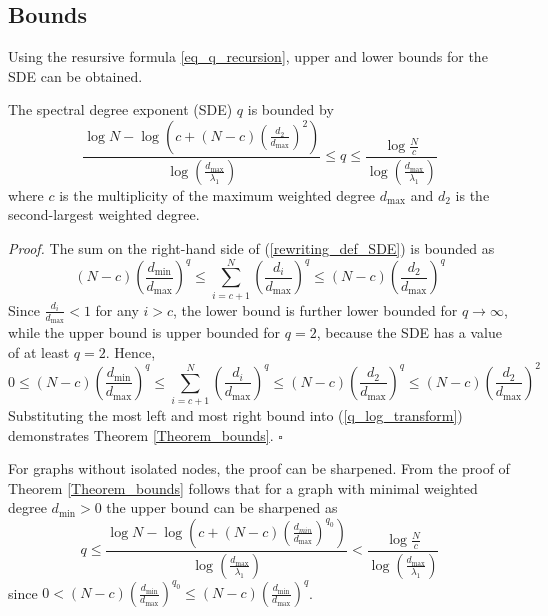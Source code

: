 \documentclass{comnet}%
\begin{document}
\subsection{Bounds}\label{sec_bounds}
Using the resursive formula \eqref{eq_q_recursion}, upper and lower bounds for the SDE can be obtained.
\begin{theorem}\label{Theorem_bounds}
	The spectral degree exponent (SDE) $q$ is bounded by
	\begin{equation}\label{eq_q_upper_bound2}
		\frac{\log N - \log\left( c + ( N-c) \left( \frac{d_{2}}{d_{\max}}\right)  ^{2} \right) }{\log\left( \frac{d_{\max}}{\lambda_{1}}\right)} \leq q \leq \frac{\log \frac{N}{c}}{\log\left( \frac{d_{\max}}{\lambda_{1}}\right) }
	\end{equation}
	where $c$ is the multiplicity of the maximum weighted degree $d_{\max}$ and $d_2$ is the second-largest weighted degree.
\end{theorem}
\textit{Proof.} The sum on the right-hand side of (\ref{rewriting_def_SDE}) is bounded as%
\[
\left(  N-c\right)  \left(  \frac{d_{\min}}{d_{\max}}\right)  ^{q}\leq
\sum_{i=c+1}^{N}\left(  \frac{d_{i}}{d_{\max}}\right)  ^{q}\leq\left(
N-c\right)  \left(  \frac{d_{2}}{d_{\max}}\right)  ^{q}%
\]
Since $\frac{d_{i}}{d_{\max}}<1$ for any $i>c$, the lower bound is further lower bounded for $q\rightarrow \infty$, while the upper bound is upper bounded for $q=2$, because the SDE has a value of at least $q=2$. Hence,
\[
0\leq\left(  N-c\right)  \left(  \frac{d_{\min}}{d_{\max}}\right)  ^{q}\leq
\sum_{i=c+1}^{N}\left(  \frac{d_{i}}{d_{\max}}\right)  ^{q}\leq \left(
N-c\right)  \left(  \frac{d_{2}}{d_{\max}}\right)  ^{q} \leq \left(
N-c\right)  \left(  \frac{d_{2}}{d_{\max}}\right)  ^{2}
\]
Substituting the most left and most right bound into (\ref{q_log_transform}) demonstrates Theorem \ref{Theorem_bounds}.  
\hfill $\square$

For graphs without isolated nodes, the proof can be sharpened. From the proof of Theorem \ref{Theorem_bounds} follows that for a graph with minimal weighted degree $d_{\min}>0$ the upper bound can be sharpened as
\begin{equation}\label{eq_q_upper_bound_better}
	q \leq \frac{\log N - \log\left( c + ( N-c) \left( \frac{d_{min}}{d_{\max}}\right)^{q_0} \right) }{\log\left( \frac{d_{\max}}{\lambda_{1}}\right)} < \frac{\log \frac{N}{c}}{\log\left( \frac{d_{\max}}{\lambda_{1}}\right) }
\end{equation}
since
\(
0<\left(  N-c\right)  \left(  \frac{d_{\min}}{d_{\max}}\right)  ^{q_0}\leq \left(  N-c\right)  \left(  \frac{d_{\min}}{d_{\max}}\right)  ^{q}
\).
\end{document}
